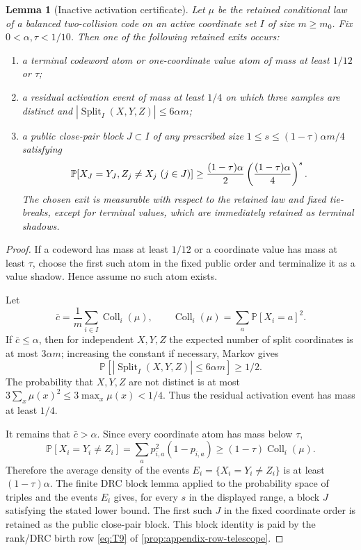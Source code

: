 \documentclass[11pt]{article}
\newcommand{\Cref}[1]{\ref{#1}}
\newtheorem{lemma}[theorem]{Lemma}
\theoremstyle{remark}
\newcommand{\Prob}{\mathbb P}
\newcommand{\Split}{\operatorname{Split}}
\newcommand{\Coll}{\operatorname{Coll}}
\begin{document}
\begin{lemma}[Inactive activation certificate]\label{lem:appendix-inactive-activation}
Let $\mu$ be the retained conditional law of a balanced two-collision code on an active coordinate set $I$ of size $m\ge m_0$.  Fix $0<\alpha,\tau<1/10$.  Then one of the following retained exits occurs:
\begin{enumerate}[label=\textup{(\roman*)}]
\item a terminal codeword atom or one-coordinate value atom of mass at least $1/12$ or $\tau$;
\item a residual activation event of mass at least $1/4$ on which three samples are distinct and $|\Split_I(X,Y,Z)|\le 6\alpha m$;
\item a public close-pair block $J\subset I$ of any prescribed size $1\le s\le (1-\tau)\alpha m/4$ satisfying
\[
        \Prob[X_J=Y_J,\\ Z_j\ne X_j\ (j\in J)]
        \ge \frac{(1-\tau)\alpha}{2}\left(\frac{(1-\tau)\alpha}{4}\right)^s .
\]
The chosen exit is measurable with respect to the retained law and fixed tie-breaks, except for terminal values, which are immediately retained as terminal shadows.
\end{enumerate}
\end{lemma}

\begin{proof}
If a codeword has mass at least $1/12$ or a coordinate value has mass at least $\tau$, choose the first such atom in the fixed public order and terminalize it as a value shadow.  Hence assume no such atom exists.

Let
\[
        \bar c=\frac1m\sum_{i\in I}\Coll_i(\mu),
        \qquad \Coll_i(\mu)=\sum_a \Prob[X_i=a]^2.
\]
If $\bar c\le \alpha$, then for independent $X,Y,Z$ the expected number of split coordinates is at most $3\alpha m$; increasing the constant if necessary, Markov gives
\[
        \Prob[|\Split_I(X,Y,Z)|\le 6\alpha m]\ge 1/2.
\]
The probability that $X,Y,Z$ are not distinct is at most $3\sum_x\mu(x)^2\le 3\max_x\mu(x)<1/4$.  Thus the residual activation event has mass at least $1/4$.

It remains that $\bar c>\alpha$.  Since every coordinate atom has mass below $\tau$,
\[
        \Prob[X_i=Y_i\ne Z_i]
        =\sum_a p_{i,a}^2(1-p_{i,a})
        \ge (1-\tau)\Coll_i(\mu).
\]
Therefore the average density of the events $E_i=\{X_i=Y_i\ne Z_i\}$ is at least $(1-\tau)\alpha$.  The finite DRC block lemma applied to the probability space of triples and the events $E_i$ gives, for every $s$ in the displayed range, a block $J$ satisfying the stated lower bound.  The first such $J$ in the fixed coordinate order is retained as the public close-pair block.  This block identity is paid by the rank/DRC birth row \eqref{eq:T9} of \Cref{prop:appendix-row-telescope}.
\end{proof}
\end{document}
